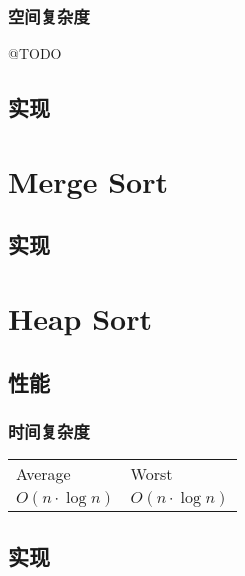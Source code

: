 \documentclass[UTF8]{report}
\begin{document}
\subsubsection{空间复杂度}
@TODO

\subsection{实现}

 


\section{Merge Sort}


\subsection{实现}


\section{Heap Sort}

\subsection{性能}

\subsubsection{时间复杂度}

\begin{table}[ht]
\begin{center}
	
	\renewcommand{\arraystretch}{1.2}
	\begin{tabular}{ | l | l |}     	

	\hline

	Average & Worst \\
	\cline{1-2}

	\(O(n \cdot \log{n})\) 	& 		\(O(n \cdot \log{n})\)  \\

	\hline

	\end{tabular}
\end{center}
\label{tab:quicksort_time_complexity}
\end{table}

\subsection{实现}
\end{document}
